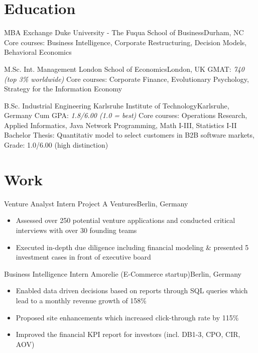 \documentclass{my_cv}
\begin{document}
\makecvtitle

\section{Education}

{MBA Exchange}
{Duke University - The Fuqua School of Business}{Durham, NC}
{}
{Core courses: Business Intelligence, Corporate Restructuring, Decision Models, Behavioral Economics}  %

{M.Sc. Int. Management}
{London School of Economics}{London, UK}
{GMAT: \textit{740 (top 3\% worldwide)}}
{Core courses: Corporate Finance, Evolutionary Psychology, Strategy for the Information Economy}  %

{B.Sc. Industrial Engineering}
{Karlsruhe Institute of Technology}{Karlsruhe, Germany}
{Cum GPA: \textit{1.8/6.00 (1.0 = best)}}
{Core courses: Operations Research, Applied Informatics, Java Network Programming, Math I-III, Statistics I-II \\
Bachelor Thesis: Quantitativ model to select customers in B2B software markets, Grade: 1.0/6.00 (high distinction)
}  %

\section{Work}
{Venture Analyst Intern}
{Project A Ventures}{Berlin, Germany}
{}
{
\begin{itemize}
\item Assessed over 250 potential venture applications and conducted critical interviews with over 30 founding teams
\item Executed in-depth due diligence including financial modeling \& presented 5 investment cases in front of executive board
\end{itemize}
}  %

{Business Intelligence Intern}
{Amorelie (E-Commerce startup)}{Berlin, Germany}
{}
{
\begin{itemize}
\item Enabled data driven decisions based on reports through SQL queries which lead to a monthly revenue growth of 158\%
\item Proposed site enhancements which increased click-through rate by 115\%
\item Improved the financial KPI report for investors (incl. DB1-3, CPO, CIR, AOV)
\end{itemize}
}  %
\end{document}
